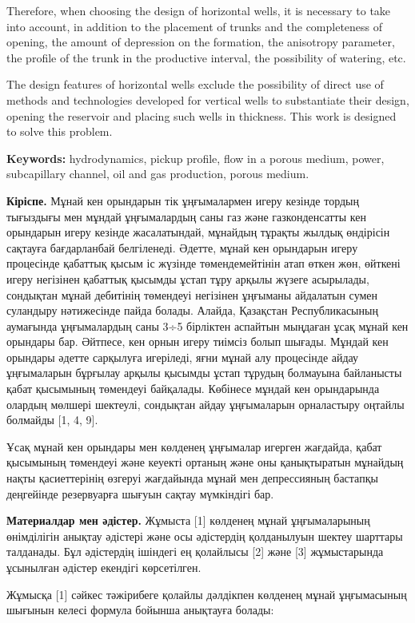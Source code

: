 Therefore, when choosing the design of horizontal wells, it is necessary
to take into account, in addition to the placement of trunks and the
completeness of opening, the amount of depression on the formation, the
anisotropy parameter, the profile of the trunk in the productive
interval, the possibility of watering, etc.

The design features of horizontal wells exclude the possibility of
direct use of methods and technologies developed for vertical wells to
substantiate their design, opening the reservoir and placing such wells
in thickness. This work is designed to solve this problem.

{\bfseries Keywords:} hydrodynamics, pickup profile, flow in a porous
medium, power, subcapillary channel, oil and gas production, porous
medium.

{\bfseries Кіріспе.} Мұнай кен орындарын тік ұңғымалармен игеру кезінде
тордың тығыздығы мен мұндай ұңғымалардың саны газ және газконденсатты
кен орындарын игеру кезінде жасалатындай, мұнайдың тұрақты жылдық
өндірісін сақтауға бағдарланбай белгіленеді. Әдетте, мұнай кен орындарын
игеру процесінде қабаттық қысым іс жүзінде төмендемейтінін атап өткен
жөн, өйткені игеру негізінен қабаттық қысымды ұстап тұру арқылы жүзеге
асырылады, сондықтан мұнай дебитінің төмендеуі негізінен ұңғыманы
айдалатын сумен суландыру нәтижесінде пайда болады. Алайда, Қазақстан
Республикасының аумағында ұңғымалардың саны 3÷5 бірліктен аспайтын
мыңдаған ұсақ мұнай кен орындары бар. Әйтпесе, кен орнын игеру тиімсіз
болып шығады. Мұндай кен орындары әдетте сарқылуға игеріледі, яғни мұнай
алу процесінде айдау ұңғымаларын бұрғылау арқылы қысымды ұстап тұрудың
болмауына байланысты қабат қысымының төмендеуі байқалады. Көбінесе
мұндай кен орындарында олардың мөлшері шектеулі, сондықтан айдау
ұңғымаларын орналастыру оңтайлы болмайды {[}1, 4, 9{]}.

Ұсақ мұнай кен орындары мен көлденең ұңғымалар игерген жағдайда, қабат
қысымының төмендеуі және кеуекті ортаның және оны қанықтыратын мұнайдың
нақты қасиеттерінің өзгеруі жағдайында мұнай мен депрессияның бастапқы
деңгейінде резервуарға шығуын сақтау мүмкіндігі бар.

{\bfseries Материалдар мен әдістер.} Жұмыста {[}1{]} көлденең мұнай
ұңғымаларының өнімділігін анықтау әдістері және осы әдістердің
қолданылуын шектеу шарттары талданады. Бұл әдістердің ішіндегі ең
қолайлысы {[}2{]} және {[}3{]} жұмыстарында ұсынылған әдістер екендігі
көрсетілген.

Жұмысқа {[}1{]} сәйкес тәжірибеге қолайлы дәлдікпен көлденең мұнай
ұңғымасының шығынын келесі формула бойынша анықтауға болады:

